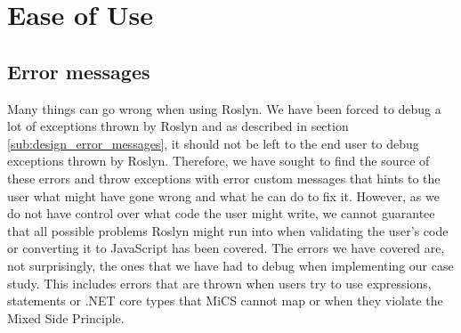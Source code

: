 \section{Ease of Use} %
\label{sec:ease_of_use}
	\subsection{Error messages} %
	\label{sub:evaluation_of_error_messages}
		Many things can go wrong when using Roslyn. We have been forced to debug a lot of exceptions thrown by Roslyn and as described in section \ref{sub:design_error_messages}, it should not be left to the end user to debug exceptions thrown by Roslyn. Therefore, we have sought to find the source of these errors and throw exceptions with error custom messages that hints to the user what might have gone wrong and what he can do to fix it. However, as we do not have control over what code the user might write, we cannot guarantee that all possible problems Roslyn might run into when validating the user's code or converting it to JavaScript has been covered. The errors we have covered are, not surprisingly, the ones that we have had to debug when implementing our case study. This includes errors that are thrown when users try to use expressions, statements or .NET core types that MiCS cannot map or when they violate the Mixed Side Principle.










